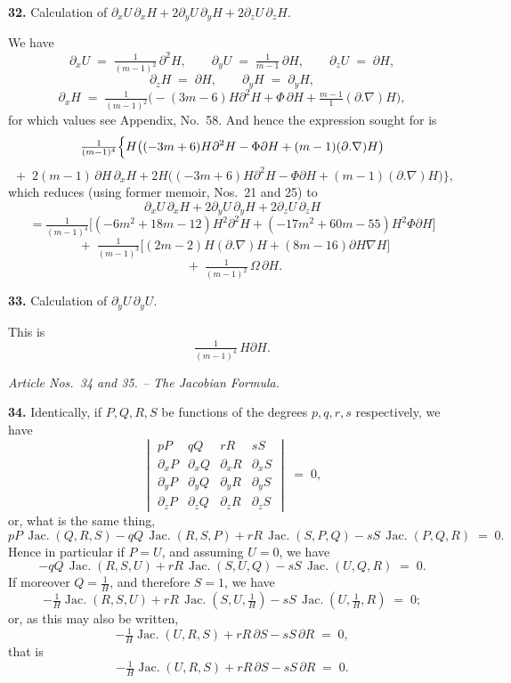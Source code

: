 \documentclass[11pt,a4paper]{article}
\providecommand{\Jac}{\operatorname{Jac.}}
\begin{document}
\medskip

\textbf{32.} Calculation of $\partial_x U\,\partial_x H + 2\partial_y U\,\partial_y H + 2\partial_z U\,\partial_z H$.

We have
\[
\partial_x U \;=\; \tfrac{1}{(m-1)^2}\,\partial^2 H,\qquad \partial_y U \;=\; \tfrac{1}{m-1}\,\partial H,\qquad \partial_z U \;=\; \partial H,
\]
\[
\partial_z H \;=\; \partial H,\qquad \partial_y H \;=\; \partial_y H,
\]
\[
\partial_x H \;=\; \tfrac{1}{(m-1)^2}\bigl(-(3m-6)H\partial^2 H + \Phi\,\partial H + \tfrac{m-1}{1}(\partial.\nabla)H\bigr),
\]
for which values see Appendix, No.~58. And hence the expression sought for is
\[
\tfrac{1}{(m-1)^4}\Bigl\{H\bigl((-3m+6)H\partial^2 H - \Phi\partial H + (m-1)(\partial.\nabla)H\bigr)
\]
\[
\;+\; 2(m-1)\,\partial H\,\partial_x H + 2H\bigl((-3m+6)H\partial^2 H - \Phi\partial H + (m-1)(\partial.\nabla)H\bigr)\Bigr\},
\]
which reduces (using former memoir, Nos.~21 and 25) to
\[
\partial_x U\,\partial_x H + 2\partial_y U\,\partial_y H + 2\partial_z U\,\partial_z H
\]
\[
= \tfrac{1}{(m-1)^4}\bigl[(-6m^2 + 18m - 12)H^2\partial^2 H + (-17m^2 + 60m - 55)H^2\Phi\partial H\bigr]
\]
\[
\;+\; \tfrac{1}{(m-1)^3}\bigl[(2m-2)H(\partial.\nabla)H + (8m - 16)\partial H\nabla H\bigr]
\]
\[
\;+\; \tfrac{1}{(m-1)^2}\,\Omega\,\partial H.
\]

\medskip

\textbf{33.} Calculation of $\partial_y U\,\partial_y U$.

This is
\[
\tfrac{1}{(m-1)^4}\,H\partial H.
\]

\bigskip

\begin{center}
\textit{Article Nos.\ 34 and 35. -- The Jacobian Formula.}
\end{center}

\textbf{34.} Identically, if $P, Q, R, S$ be functions of the degrees $p, q, r, s$ respectively, we have
\[
\begin{vmatrix} pP & qQ & rR & sS \\ \partial_x P & \partial_x Q & \partial_x R & \partial_x S \\ \partial_y P & \partial_y Q & \partial_y R & \partial_y S \\ \partial_z P & \partial_z Q & \partial_z R & \partial_z S \end{vmatrix} \;=\; 0,
\]
or, what is the same thing,
\[
pP\,\Jac(Q,R,S) - qQ\,\Jac(R,S,P) + rR\,\Jac(S,P,Q) - sS\,\Jac(P,Q,R) \;=\; 0.
\]
Hence in particular if $P = U$, and assuming $U = 0$, we have
\[
-qQ\,\Jac(R,S,U) + rR\,\Jac(S,U,Q) - sS\,\Jac(U,Q,R) \;=\; 0.
\]
If moreover $Q = \tfrac{1}{H}$, and therefore $S = 1$, we have
\[
-\tfrac{1}{H}\Jac(R,S,U) + rR\,\Jac(S,U,\tfrac{1}{H}) - sS\,\Jac(U,\tfrac{1}{H},R) \;=\; 0;
\]
or, as this may also be written,
\[
-\tfrac{1}{H}\Jac(U,R,S) + rR\,\partial S - sS\,\partial R \;=\; 0,
\]
that is
\[
-\tfrac{1}{H}\Jac(U,R,S) + rR\,\partial S - sS\,\partial R \;=\; 0.
\]
\end{document}
